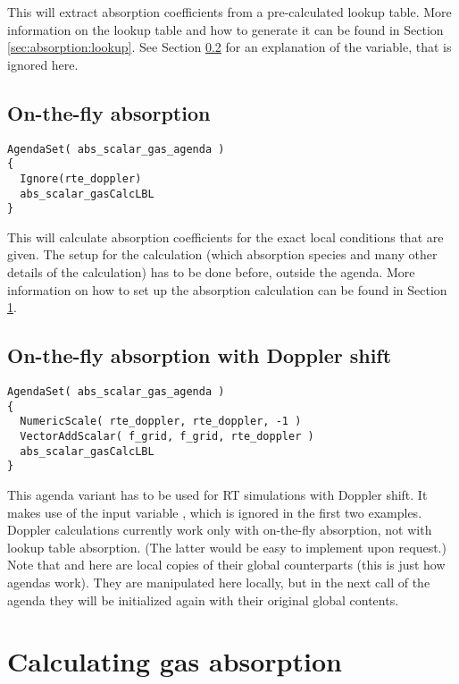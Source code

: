 This will extract absorption coefficients from a pre-calculated lookup
table.  More information on the lookup table and how to generate it
can be found in Section \ref{sec:absorption:lookup}.  See Section
\ref{sec:absorption:doppler} for an explanation of the
 variable, that is ignored here.
 
\subsection{On-the-fly absorption}

\begin{lstlisting}
AgendaSet( abs_scalar_gas_agenda )
{
  Ignore(rte_doppler)
  abs_scalar_gasCalcLBL
}
\end{lstlisting}

This will calculate absorption coefficients for the exact local
conditions that are given.  The setup for the calculation (which
absorption species and many other details of the calculation) has to
be done before, outside the agenda.  More information on how to set up
the absorption calculation can be found in Section
\ref{sec:absorption:calculating}.  

\subsection{On-the-fly absorption with Doppler shift}
\label{sec:absorption:doppler}

\begin{lstlisting}
AgendaSet( abs_scalar_gas_agenda )
{
  NumericScale( rte_doppler, rte_doppler, -1 )
  VectorAddScalar( f_grid, f_grid, rte_doppler )
  abs_scalar_gasCalcLBL
}
\end{lstlisting}

This agenda variant has to be used for RT simulations with Doppler
shift.  It makes use of the input variable ,
which is ignored in the first two examples.  Doppler calculations
currently work only with on-the-fly absorption, not with lookup table
absorption. (The latter would be easy to implement upon request.) Note
that  and  here are local
copies of their global counterparts (this is just how agendas
work). They are manipulated here locally, but in the next call of the
agenda they will be initialized again with their original global
contents. 

\section{Calculating gas absorption}
\label{sec:absorption:calculating}

